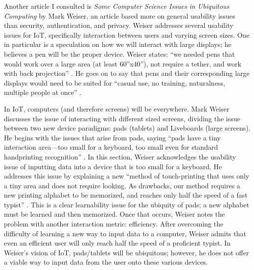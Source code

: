 \documentclass[11pt, oneside]{article}   	%
\begin{document}
Another article I consulted is \textit{Some Computer Science Issues in Ubiquitous Computing} by Mark Weiser, an article based more on general usability issues than security, authentication, and privacy. Weiser addresses several usability issues for IoT, specifically interaction between users and varying screen sizes. One in particular is a speculation on how we will interact with large displays; he believes a pen will be the proper device. Weiser states: ``we needed pens that would work over a large area (at least 60''x40''), not require a tether, and work with back projection'' \cite{weiser}. He goes on to say that pens and their corresponding large displays would need to be suited for ``casual use, no training, naturalness, multiple people at once'' \cite{weiser}.

In IoT, computers (and therefore screens) will be everywhere. Mark Weiser discusses the issue of interacting with different sized screens, dividing the issue between two new device paradigms: pads (tablets) and Liveboards (large screens). He begins with the issues that arise from pads, saying ``pads have a tiny interaction area---too small for a keyboard, too small even for standard handprinting recognition'' \cite{weiser}. In this section, Weiser acknowledges the usability issue of inputting data into a device that is too small for a keyboard. He addresses this issue by explaining a new ``method of touch-printing that uses only a tiny area and does not require looking. As drawbacks, our method requires a new printing alphabet to be memorized, and reaches only half the speed of a fast typist'' \cite{weiser}. This is a clear learnability issue for the ubiquity of pads; a new alphabet must be learned and then memorized. Once that occurs, Weiser notes the problem with another interaction metric: efficiency. After overcoming the difficulty of learning a new way to input data to a computer, Weiser admits that even an efficient user will only reach half the speed of a proficient typist. In Weiser's vision of IoT, pads/tablets will be ubiquitous; however, he does not offer a viable way to input data from the user onto these various devices.
\end{document}
